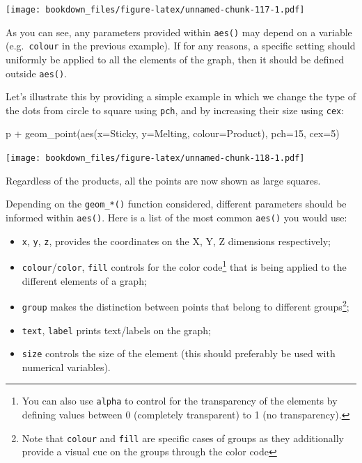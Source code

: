 \documentclass[
]{krantz}
\makeatletter
\newenvironment{Shaded}{\begin{snugshade}}{\end{snugshade}}
\newcommand{\AttributeTok}[1]{\textcolor[rgb]{0.61,0.61,0.61}{#1}}
\newcommand{\DecValTok}[1]{\textcolor[rgb]{0.06,0.06,0.06}{#1}}
\newcommand{\FunctionTok}[1]{\textcolor[rgb]{0,0,0}{#1}}
\newcommand{\NormalTok}[1]{#1}
\newcommand{\SpecialCharTok}[1]{\textcolor[rgb]{0,0,0}{#1}}
\providecommand{\tightlist}{%
  \setlength{\itemsep}{0pt}\setlength{\parskip}{0pt}}
\newenvironment{kframe}{%
\medskip{}
\setlength{\fboxsep}{.8em}
 \def\at@end@of@kframe{}%
 \ifinner\ifhmode%
  \def\at@end@of@kframe{\end{minipage}}%
  \begin{minipage}{\columnwidth}%
 \fi\fi%
 \def\FrameCommand##1{\hskip\@totalleftmargin \hskip-\fboxsep
 \colorbox{shadecolor}{##1}\hskip-\fboxsep
     \hskip-\linewidth \hskip-\@totalleftmargin \hskip\columnwidth}%
 \MakeFramed {\advance\hsize-\width
   \@totalleftmargin\z@ \linewidth\hsize
   \@setminipage}}%
 {\par\unskip\endMakeFramed%
 \at@end@of@kframe}
\renewenvironment{Shaded}{\begin{kframe}}{\end{kframe}}
\makeatother
\begin{document}
\texttt{[image: bookdown\_files/figure-latex/unnamed-chunk-117-1.pdf]}

As you can see, any parameters provided within \texttt{aes()} may depend on a variable (e.g.~\texttt{colour} in the previous example).
If for any reasons, a specific setting should uniformly be applied to all the elements of the graph, then it should be defined outside \texttt{aes()}.

Let's illustrate this by providing a simple example in which we change the type of the dots from circle to square using \texttt{pch}, and by increasing their size using \texttt{cex}:

\begin{Shaded}
\begin{Highlighting}[]
\NormalTok{p }\SpecialCharTok{+} \FunctionTok{geom\_point}\NormalTok{(}\FunctionTok{aes}\NormalTok{(}\AttributeTok{x=}\NormalTok{Sticky, }\AttributeTok{y=}\NormalTok{Melting, }\AttributeTok{colour=}\NormalTok{Product), }\AttributeTok{pch=}\DecValTok{15}\NormalTok{, }\AttributeTok{cex=}\DecValTok{5}\NormalTok{)}
\end{Highlighting}
\end{Shaded}

\texttt{[image: bookdown\_files/figure-latex/unnamed-chunk-118-1.pdf]}

Regardless of the products, all the points are now shown as large squares.

Depending on the \texttt{geom\_*()} function considered, different parameters should be informed within \texttt{aes()}. Here is a list of the most common \texttt{aes()} you would use:

\begin{itemize}
\tightlist
\item
  \texttt{x}, \texttt{y}, \texttt{z}, provides the coordinates on the X, Y, Z dimensions respectively;
\item
  \texttt{colour}/\texttt{color}, \texttt{fill} controls for the color code\footnote{You can also use \texttt{alpha} to control for the transparency of the elements by defining values between 0 (completely transparent) to 1 (no transparency).} that is being applied to the different elements of a graph;
\item
  \texttt{group} makes the distinction between points that belong to different groups\footnote{Note that \texttt{colour} and \texttt{fill} are specific cases of groups as they additionally provide a visual cue on the groups through the color code};
\item
  \texttt{text}, \texttt{label} prints text/labels on the graph;
\item
  \texttt{size} controls the size of the element (this should preferably be used with numerical variables).
\end{itemize}
\end{document}
